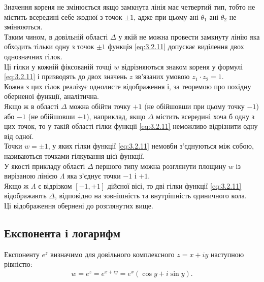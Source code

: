 Значення кореня не змінюється якщо замкнута лінія має четвертий тип, тобто не містить всередині себе жодної з точок $\pm 1$, адже при цьому ані $\theta_1$ ані $\theta_2$ не змінюються. \\

Таким чином, в довільній області $\Delta$ у якій не можна провести замкнуту лінію яка обходить тільки одну з точок $\pm 1$ функція \eqref{eq:3.2.11} допускає виділення двох однозначних гілок. \\

Ці гілки у кожній фіксованій точці $w$ відрізняються знаком кореня у формулі \eqref{eq:3.2.11} і призводять до двох значень $z$ зв'язаних умовою $z_1 \cdot z_2 = 1$. \\

Кожна з цих гілок реалізує однолисте відображення і, за теоремою про похідну оберненої функції, аналітична. \\

Якщо ж в області $\Delta$ можна обійти точку $+1$ (не обійшовши при цьому точку $-1$) або $-1$ (не обійшовши $+1$), наприклад, якщо $\Delta$ містить всередині хоча б одну з цих точок, то у такій області гілки функції \eqref{eq:3.2.11} неможливо відрізнити одну від одної. \\

Точки $w = \pm 1$, у яких гілки функції \eqref{eq:3.2.11} немовби з'єднуються між собою, називаються точками гілкування цієї функції. \\

У якості прикладу області $\Delta$ першого типу можна розглянути площину $w$ із вирізаною лінією $\Lambda$ яка з'єднує точки $-1$ і $+1$. \\

Якщо ж $\Lambda$ є відрізком $[-1,+1]$ дійсної вісі, то дві гілки функції \eqref{eq:3.2.11} відображають $\Delta$, відповідно на зовнішність та внутрішність одиничного кола. \\

Ці відображення обернені до розглянутих вище.

\subsection{Експонента і логарифм}

Експоненту $e^z$ визначимо для довільного комплексного $z = x + i y$ наступною рівністю:
\begin{equation}
	\label{eq:3.3.1}
	w = e^z = e^{x + i y} = e^x (\cos y + i \sin y).
\end{equation}

